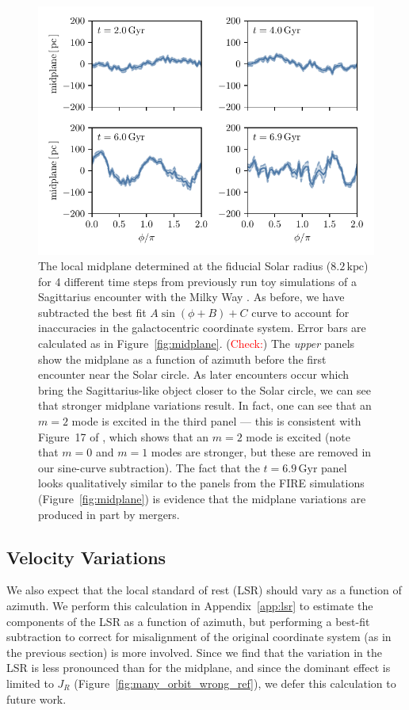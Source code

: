 \documentclass[twocolumn]{aastex62}
\newcommand{\Gus}[1]{\textcolor{red}{#1}}
\newcommand{\kpc}{\text{kpc}}
\newcommand{\Gyr}{\text{Gyr}}
\begin{document}
\begin{figure}
\begin{center}
\includegraphics[width=342.078286667pt]{fig/midplane_fit_chervinsim.pdf}
\end{center}
\caption{The local midplane determined at the fiducial Solar radius
($8.2\,\kpc$) for 4 different time steps from previously run toy simulations
of a Sagittarius encounter with the Milky Way \citep{2018MNRAS.481..286L}. As
before, we have subtracted the best fit $A\sin{(\phi+B)}+C$ curve to account
for inaccuracies in the galactocentric coordinate system. Error bars are
calculated as in Figure~\ref{fig:midplane}. (\Gus{Check:}) The {\em upper}
panels show the midplane as a function of azimuth before the first encounter
near the Solar circle. As later encounters occur which bring the
Sagittarius-like object closer to the Solar circle, we can see that stronger
midplane variations result. In fact, one can see that an $m=2$ mode is excited
in the third panel --- this is consistent with Figure~17 of
\citet{2018MNRAS.481..286L}, which shows that an $m=2$ mode is excited (note
that $m=0$ and $m=1$ modes are stronger, but these are removed in our
sine-curve subtraction). The fact that the $t=6.9\,\Gyr$ panel looks
qualitatively similar to the panels from the FIRE simulations
(Figure~\ref{fig:midplane}) is evidence that the midplane variations are
produced in part by mergers.}
\label{fig:midplane_chervin}
\end{figure}

\subsection{Velocity Variations} \label{ssec:lsr_var}
We also expect that the local standard of rest (LSR) should vary as a function
of azimuth. We perform this calculation in Appendix~\ref{app:lsr} to estimate
the components of the LSR as a function of azimuth, but performing a best-fit
subtraction to correct for misalignment of the original coordinate system (as
in the previous section) is more involved. Since we find that the variation in
the LSR is less pronounced than for the midplane, and since the dominant
effect is limited to $J_R$ (Figure~\ref{fig:many_orbit_wrong_ref}), we defer
this calculation to future work.
\end{document}
